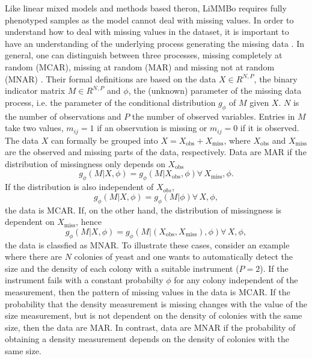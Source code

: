 Like linear mixed models and methods based theron, LiMMBo requires fully phenotyped samples as the model cannot deal with missing values. In order to understand how to deal with missing values in the dataset, it is important to have an understanding of the underlying process generating the missing data \citep{Rubin1976}. In general, one can distinguish between three processes, missing completely at random (MCAR), missing at random (MAR) and missing not at random (MNAR) \citep{Rubin2002}. Their formal definitions are based on the data \(X  \in R^{N,P}\),  the binary indicator matrix \(M  \in R^{N,P}\)  and \(\phi\), the (unknown) parameter of the missing data process, i.e. the parameter of the conditional distribution \(g_\phi\) of \(M\) given \(X\). \(N\) is the number of observations and \(P\) the number of observed variables. Entries in \(M\) take two values,  \(m_{ij} = 1 \) if an observation is missing or  \(m_{ij} = 0\) if it is observed. The data \(X\) can formally be grouped into \(X=X_\text{obs} + X_\text{miss}\), where \(X_\text{obs}\) and  \(X_\text{miss}\) are the observed and missing parts of the data, respectively. Data are MAR if the distribution of missingness only depends on \(X_{\text{obs}}\)
\begin{equation}
g_\phi(M | X, \phi) =  g_\phi(M | X_{\text{obs}}, \phi)  \forall \, X_\text{miss}, \phi.
\end{equation}
If the distribution is also independent of \(X_{obs}\), 
\begin{equation}
g_\phi(M | X, \phi) =  g_\phi(M | \phi) \forall \, X, \phi,
\end{equation}
the data is MCAR. If, on the other hand, the distribution of missingness is dependent on \(X_{\text{miss}}\), hence
\begin{equation}
g_\phi(M | X, \phi) =  g_\phi(M | (X_{\text{obs}}, X_{\text{miss}}),\phi) \forall \, X, \phi,
\end{equation}
the data is classfied as MNAR. To illustrate these cases, consider an example where there are \(N\) colonies of yeast and one wants to automatically detect the size and the density of each colony with a suitable instrument (\(P=2\)). If the instrument fails with a constant probabilty \(\phi\) for any colony independent of the measurement, then the pattern of missing values in the data is MCAR. If the probability that the density measurement is missing changes with the value of the size measurement, but is not dependent on the density of colonies with the same size, then the data are MAR. In contrast, data are MNAR if the probability of obtaining a density measurement depends on the density of colonies with the same size. 

